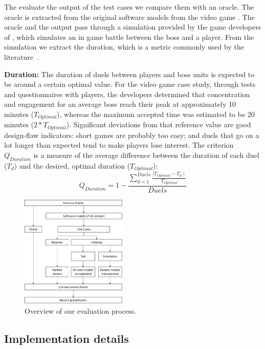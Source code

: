 The evaluate the output of the test cases we compare them with an oracle. The oracle is extracted from the original software models from the video game \CaseStudy{}. The oracle and the output pass through a simulation provided by the game developers of \CaseStudy{}, which simulates an in game battle between the boss and a player. From the simulation we extract the duration, which is a metric commonly used by the literature~\cite{browne2010evolutionary}.

{\bf Duration:} The duration of duels between players and boss units is expected to be around a certain optimal value. For the video game case study, through tests and questionnaires with players, the developers determined that concentration and engagement for an average boss reach their peak at approximately 10 minutes ($T_{Optimal}$), whereas the maximum accepted time was estimated to be 20 minutes ($2*T_{Optimal}$). Significant deviations from that reference value are good design-flaw indicators: short games are probably too easy; and duels that go on a lot longer than expected tend to make players lose interest. The criterion $Q_{Duration}$ is a measure of the average difference between the duration of each duel ($T_{d}$) and the desired, optimal duration ($T_{Optimal}$):
\begin{equation}
Q_{Duration} =  1 - \frac{\sum\limits_{d=1}^{Duels}\frac{\mid T_{Optimal} - T_{d} \mid}{T_{Optimal}}}{Duels} 
\end{equation}

\begin{figure}[h]
    \centering
    \includegraphics[width=0.45\textwidth]{Figures/evaluation_process.png}
    \caption{Overview of our evaluation process.}
    \label{fig:evaluation}
\end{figure}

\subsection{Implementation details}

